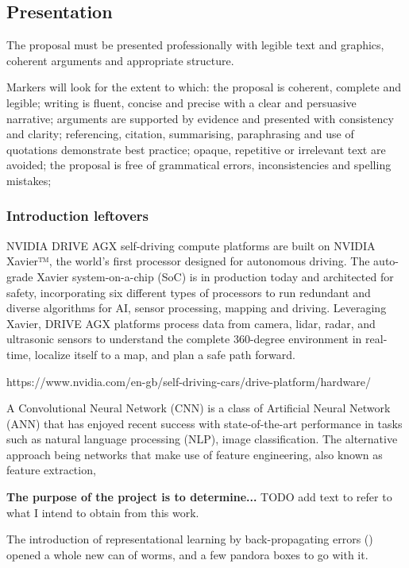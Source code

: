 \subsection{Presentation}

The proposal must be presented professionally with legible text and graphics, coherent arguments and appropriate structure.

Markers will look for the extent to which: the proposal is coherent, complete and legible; writing is fluent, concise and precise with a clear and persuasive narrative; arguments are supported by evidence and presented with consistency and clarity; referencing, citation, summarising, paraphrasing and use of quotations demonstrate best practice; opaque, repetitive or irrelevant text are avoided; the proposal is free of grammatical errors, inconsistencies and spelling mistakes;


\subsubsection{Introduction leftovers}


NVIDIA DRIVE AGX self-driving compute platforms are built on NVIDIA Xavier™, the world’s first processor designed for autonomous driving. The auto-grade Xavier system-on-a-chip (SoC) is in production today and architected for safety, incorporating six different types of processors to run redundant and diverse algorithms for AI, sensor processing, mapping and driving. Leveraging Xavier, DRIVE AGX platforms process data from camera, lidar, radar, and ultrasonic sensors to understand the complete 360-degree environment in real-time, localize itself to a map, and plan a safe path forward.

https://www.nvidia.com/en-gb/self-driving-cars/drive-platform/hardware/




A Convolutional Neural Network (CNN) is a class of Artificial Neural Network (ANN) that has enjoyed recent success with state-of-the-art performance in tasks such as natural language processing (NLP), image classification. The alternative approach being networks that make use of feature engineering, also known as feature extraction, 

\textbf{The purpose of the project is to determine...}  
TODO add text to refer to what I intend to obtain from this work.

 

The introduction of representational learning by back-propagating errors (\cite{Rumelhart:1986we}) opened a whole new can of worms, and a few pandora boxes to go with it.

